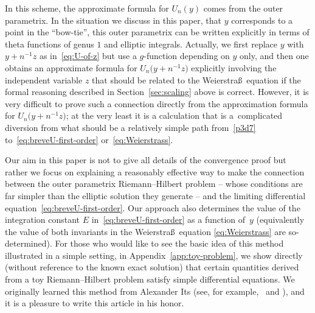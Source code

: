 \documentclass[11pt]{article}
\numberwithin{equation}{section}
\numberwithin{equation}{section}
\begin{document}
In this scheme, the approximate formula for $U_n(y)$ comes from the outer parametrix.
In the situation we discuss in this paper, that $y$ corresponds to a point in the
``bow-tie'', this outer parametrix can be written explicitly in terms of theta
functions of genus $1$ and elliptic integrals. Actually, we first replace $y$ with
$y+n^{-1}z$ as in~\eqref{eq:U-of-z} but use a $g$-function depending on $y$ only, and
then one obtains an approximate formula for $U_n\bigl(y+n^{-1}z\bigr)$ explicitly involving the
independent variable $z$ that should be related to the Weierstra\ss\ equation if the
formal reasoning described in Section~\ref{sec:scaling} above is correct. However,
it is very difficult to prove such a connection directly from the approximation
formula for $U_n\bigl(y+n^{-1}z\bigr)$; at the very least it is a calculation that is a~complicated
diversion from what should be a relatively simple path from~\eqref{p3d7}
to~\eqref{eq:breveU-first-order} or~\eqref{eq:Weierstrass}.

Our aim in this paper is not to give all details of the convergence proof but rather
we focus on explaining a reasonably effective way to make the connection between the
outer parametrix Riemann--Hilbert problem -- whose conditions are far simpler than
the elliptic solution they generate -- and the limiting differential equation~\eqref{eq:breveU-first-order}. Our approach also determines the value of the
integration constant $E$ in~\eqref{eq:breveU-first-order} as a function of~$y$
(equivalently the value of both invariants in the Weierstra\ss\ equation
\eqref{eq:Weierstrass} are so-determined).
For those who would like to see the basic idea of this method illustrated
in a simple setting, in Appendix~\ref{app:toy-problem}, we show directly (without
reference to the known exact solution) that certain quantities derived from
a toy Riemann--Hilbert problem satisfy simple differential equations.
We originally learned this method from
Alexander Its (see, for example,~\cite[Chapter~8]{FokasIKN:2006} and
\cite{ItsK:2002}),
and it is a pleasure to write this article in his honor.
\end{document}
